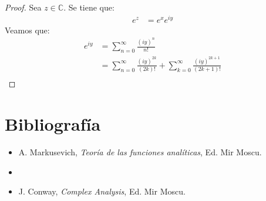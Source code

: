 \documentclass[12pt]{report}
\theoremstyle{largebreak}
\begin{document}
    \begin{proof}
        Sea $z\in\mathbb{C}$. Se tiene que:
        \begin{equation*}
            \begin{split}
                e^z&=e^{x}e^{iy}
            \end{split}
        \end{equation*}
        Veamos que:
        \begin{equation*}
            \begin{split}
                e^{ iy}&=\sum_{n=0}^\infty\frac{(iy)^n}{n!}\\
                &=\sum_{n=0}^\infty\frac{(iy)^{2k}}{(2k)!}+\sum_{k=0}^\infty\frac{(iy)^{2k+1}}{(2k+1)!}\\
            \end{split}
        \end{equation*}
    \end{proof}

    \chapter*{Bibliografía}

    \begin{itemize}
        \item A. Markusevich, \textit{Teoría de las funciones analíticas}, Ed. Mir Moscu.
        \item \item J. Conway, \textit{Complex Analysis}, Ed. Mir Moscu.
    \end{itemize}
    
\end{document}
